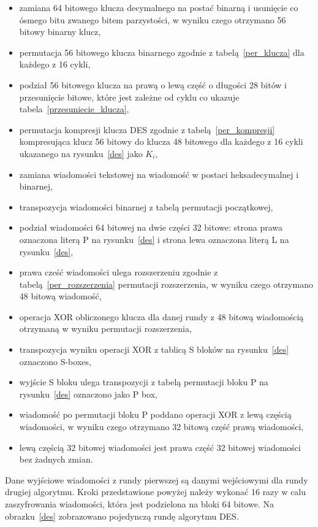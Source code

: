 \documentclass[12p]{article}
\begin{document}
\begin{itemize}
\item zamiana 64 bitowego klucza decymalnego na postać binarną i usunięcie co ósmego bitu zwanego bitem parzystości, w wyniku czego otrzymano 56 bitowy binarny klucz,
\item permutacja 56 bitowego klucza binarnego zgodnie z tabelą~\ref{per_klucza} dla każdego z 16 cykli,
\item podział 56 bitowego klucza na prawą o lewą część o długości 28 bitów i przesunięcie bitowe, które jest zależne od cyklu co ukazuje tabela~\ref{przesuniecie_klucza},
\item permutacja kompresji klucza DES zgodnie z tabelą~\ref{per_kompresji} kompresująca klucz 56 bitowy do klucza 48 bitowego dla każdego z 16 cykli ukazanego na rysunku~\ref{des} jako $K_{i}$,
\item zamiana wiadomości tekstowej na wiadomość w postaci heksadecymalnej i binarnej,
\item transpozycja wiadomości binarnej z tabelą permutacji początkowej,
\item podział wiadomości 64 bitowej na dwie części 32 bitowe: strona prawa oznaczona literą P na rysunku~\ref{des} i strona lewa oznaczona literą L na rysunku~\ref{des},
\item prawa cześć wiadomości ulega rozszerzeniu zgodnie z tabelą~\ref{per_rozszerzenia} permutacji rozszerzenia, w wyniku czego otrzymano 48 bitową wiadomość,
\item operacja XOR obliczonego klucza dla danej rundy z 48 bitową wiadomością otrzymaną w wyniku permutacji rozszerzenia,
\item transpozycja wyniku operacji XOR z tablicą S bloków na rysunku~\ref{des} oznaczono S-boxes,
\item wyjście S bloku ulega transpozycji z tabelą permutacji bloku P na rysunku~\ref{des} oznaczono jako P box,
\item wiadomość po permutacji bloku P poddano operacji XOR z lewą częścią wiadomości, w wyniku czego otrzymano 32 bitową część prawą wiadomości,
\item lewą częścią 32 bitowej wiadomości jest prawa część 32 bitowej wiadomości bez żadnych zmian.
\end{itemize}
Dane wyjściowe wiadomości z rundy pierwszej są danymi wejściowymi dla rundy drugiej algorytmu. Kroki przedstawione powyżej należy wykonać 16 razy w calu zaszyfrowania wiadomości, która jest podzielona na bloki 64 bitowe. Na obrazku~\ref{des} zobrazowano pojedynczą rundę algorytmu DES.
\end{document}
